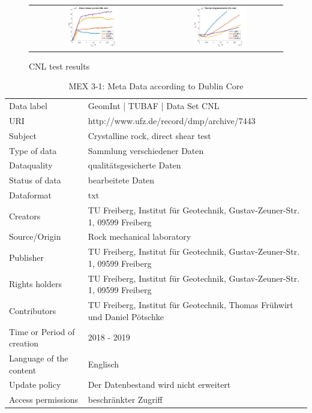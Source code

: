 \begin{figure}[!ht]
\begin{tabular}{cc}
\includegraphics[width=0.45\textwidth]{./figures/CNLShearCurvesAll.png}     
& 
\includegraphics[width=0.45\textwidth]{./figures/CNLDilatationAll.png} 
\end{tabular}
\caption{CNL test results}
\label{fig:DataCNLGraniteLab}
\end{figure}

\begin{table}[h!]
\caption{MEX 3-1: Meta Data according to Dublin Core}
\label{tab:}
\small
\begin{tabular}{R{3cm}|L{7cm}}
\hline
%
Data label & GeomInt | TUBAF | Data Set CNL \\
URI & http://www.ufz.de/record/dmp/archive/7443 \\
Subject  & Crystalline rock, direct shear test \\
Type of data  & Sammlung verschiedener Daten \\
Dataquality  & qualitätsgesicherte Daten \\
Status of data  & bearbeitete Daten \\
Dataformat  & txt \\
Creators  & TU Freiberg, Institut für Geotechnik, Gustav-Zeuner-Str. 1, 09599 Freiberg \\
Source/Origin  & Rock mechanical laboratory \\
Publisher  & TU Freiberg, Institut für Geotechnik, Gustav-Zeuner-Str. 1, 09599 Freiberg \\
Rights holders  & TU Freiberg, Institut für Geotechnik, Gustav-Zeuner-Str. 1, 09599 Freiberg \\
Contributors  & TU Freiberg, Institut für Geotechnik, Thomas Frühwirt und Daniel Pötschke \\
Time or Period of creation  & 2018 - 2019 \\
Language of the content & Englisch \\
Update policy  & Der Datenbestand wird nicht erweitert \\
Access permissions  & beschränkter Zugriff \\
%
\hline
\end{tabular}
\end{table}


